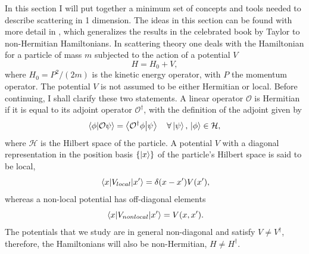 In this section I will put together a minimum set of concepts and tools needed to describe scattering in 1 dimension. The ideas in this section can be found with more detail in \cite{Muga2004}, which generalizes the results in the celebrated book by Taylor \cite{Taylor1972} to non-Hermitian Hamiltonians. In scattering theory one deals with the Hamiltonian for a particle of mass $m$ subjected to the action of a potential $V$
%
\begin{equation}
  H =  H_0 + V,
\end{equation}
%
where $H_0=P^2/(2m)$ is the kinetic energy operator, with $P$ the momentum operator. The potential $V$ is not assumed to be either Hermitian or local. Before continuing, I shall clarify these two statements. A linear operator $\mathcal{O}$ is Hermitian if it is equal to its adjoint operator $\mathcal{O}^\dagger$, with the definition of the adjoint given by
%
\begin{equation}
  \braket{\phi}{\mathcal{O}\psi} = \braket{\mathcal{O}^\dagger\phi}{\psi}\quad\forall\ket{\psi},\,\ket{\phi}\in\mathcal{H},
  \label{eq:chapter1_adjointLinearOperators}
\end{equation}
%
where $\mathcal{H}$ is the Hilbert space of the particle. A potential $V$ with a diagonal representation in the position basis $\{\ket{x}\}$ of the particle's Hilbert space is said to be local,
%
\begin{equation}
  \mel{x}{V_{local}}{x'} = \delta(x-x')V(x'),
  \label{eq:chapter1_localPotential}
\end{equation}
%
whereas a non-local potential has off-diagonal elements
%
\begin{equation}
  \mel{x}{V_{non local}}{x'} = V(x,x').
  \label{eq:chapter1_nonLocalPotential}
\end{equation}
%
The potentials that we study are in general non-diagonal and satisfy $V \neq V^\dagger$, therefore, the Hamiltonians will also be non-Hermitian, $H \neq H^\dagger$.

